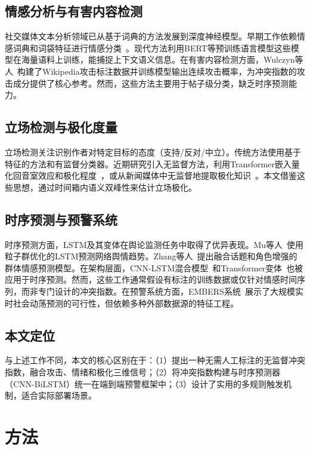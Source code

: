 \documentclass[conference]{IEEEtran}
\begin{document}
\subsection{情感分析与有害内容检测}

社交媒体文本分析领域已从基于词典的方法发展到深度神经模型。早期工作依赖情感词典和词袋特征进行情感分类~\cite{Kaity2020}。现代方法利用BERT等预训练语言模型\textemdash 这些模型在海量语料上训练，能捕捉上下文语义信息。在有害内容检测方面，Wulczyn等人~\cite{Wulczyn2017}构建了Wikipedia攻击标注数据并训练模型输出连续攻击概率，为冲突指数的攻击成分提供了核心参考。然而，这些方法主要用于帖子级分类，缺乏时序预测能力。

\subsection{立场检测与极化度量}

立场检测关注识别作者对特定目标的态度（支持/反对/中立）。传统方法使用基于特征的方法和有监督分类器。近期研究引入无监督方法，利用Transformer嵌入量化回音室效应和极化程度~\cite{ghafouri2024echo}，或从新闻媒体中无监督地提取极化知识~\cite{paschalides2025polar}。本文借鉴这些思想，通过时间箱内语义双峰性来估计立场极化。

\subsection{时序预测与预警系统}

时序预测方面，LSTM及其变体在舆论监测任务中取得了优异表现。Mu等人~\cite{Mu2023IPSO}使用粒子群优化的LSTM预测网络舆情趋势。Zhang等人~\cite{Zhang2024TRESP}提出融合话题和角色增强的群体情感预测模型。在架构层面，CNN-LSTM混合模型~\cite{Zhang2024TRESP}和Transformer变体~\cite{zhou2021informer}也被应用于时序预测。然而，这些工作通常假设有标注的训练数据或仅针对情感时间序列，而非专门设计的冲突指数。在预警系统方面，EMBERS系统~\cite{embers2025}展示了大规模实时社会动荡预测的可行性，但依赖多种外部数据源的特征工程。

\subsection{本文定位}

与上述工作不同，本文的核心区别在于：（1）提出一种无需人工标注的无监督冲突指数，融合攻击、情绪和极化三维信号；（2）将冲突指数构建与时序预测器（CNN-BiLSTM）统一在端到端预警框架中；（3）设计了实用的多规则触发机制，适合实际部署场景。

\section{方法}
\end{document}
